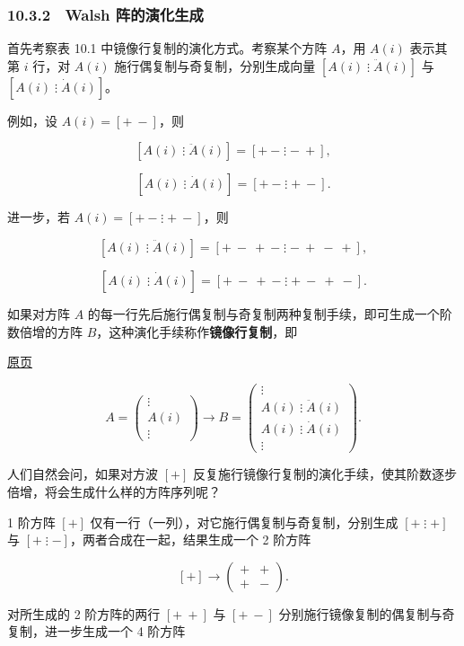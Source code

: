\documentclass[
  10pt,
  fontset=fandol]{ctexart}
\begin{document}
\subsubsection{10.3.2　Walsh 阵的演化生成}\label{walsh-ux9635ux7684ux6f14ux5316ux751fux6210}

首先考察表 10.1 中镜像行复制的演化方式。考察某个方阵 \(A\)，用 \(A(i)\) 表示其第 \(i\) 行，对 \(A(i)\) 施行偶复制与奇复制，分别生成向量 \([A(i)\mathrel{\vdots}\ddot A(i)]\) 与 \([A(i)\mathrel{\vdots}\dot A(i)]\)。

例如，设 \(A(i)=[+\ -]\)，则

\[
[A(i)\mathrel{\vdots}\ddot A(i)]=[+\ -\mathrel{\vdots}-\ +],
\]

\[
[A(i)\mathrel{\vdots}\dot A(i)]=[+\ -\mathrel{\vdots}+\ -].
\]

进一步，若 \(A(i)=[+\ -\mathrel{\vdots}+\ -]\)，则

\[
[A(i)\mathrel{\vdots}\ddot A(i)]=[+\ -\ +\ -\mathrel{\vdots}-\ +\ -\ +],
\]

\[
[A(i)\mathrel{\vdots}\dot A(i)]=[+\ -\ +\ -\mathrel{\vdots}+\ -\ +\ -].
\]

如果对方阵 \(A\) 的每一行先后施行偶复制与奇复制两种复制手续，即可生成一个阶数倍增的方阵 \(B\)，这种演化手续称作\textbf{镜像行复制}，即

\href{../../source-images/pdf-267.jpeg}{原页}

\[
A=\begin{pmatrix}\vdots\\A(i)\\\vdots\end{pmatrix}
\longrightarrow B=\begin{pmatrix}
\vdots\\
A(i)\mathrel{\vdots}\ddot A(i)\\
A(i)\mathrel{\vdots}\dot A(i)\\
\vdots
\end{pmatrix}.
\]

人们自然会问，如果对方波 \([+]\) 反复施行镜像行复制的演化手续，使其阶数逐步倍增，将会生成什么样的方阵序列呢？

1 阶方阵 \([+]\) 仅有一行（一列），对它施行偶复制与奇复制，分别生成 \([+\mathrel{\vdots}+]\) 与 \([+\mathrel{\vdots}-]\)，两者合成在一起，结果生成一个 2 阶方阵

\[
[+]\longrightarrow\begin{pmatrix}+&+\\+&-\end{pmatrix}.
\]

对所生成的 2 阶方阵的两行 \([+\ +]\) 与 \([+\ -]\) 分别施行镜像复制的偶复制与奇复制，进一步生成一个 4 阶方阵
\end{document}
